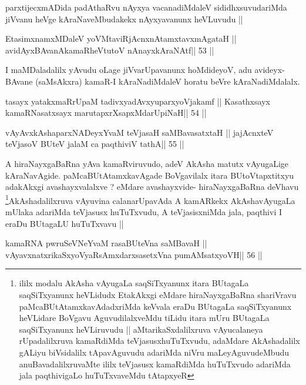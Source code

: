 \begin{artha}
parxtijecxmADida padAthaRvu nAyxya vacanadiMdaleV sididhxsuvudariMda
jiVvanu heVge kAraNaveMbudakekx nAyxyavanunx heVLuvudu ||
\end{artha}

\begin{shl}
EtasimxnamxMDaleV yoV\s MtaviRjAcnxnAtamxtavxmAgataH ||
avidAyxBAvanAkamaRheVtutoV nAnayxkAraNAtf\hfill || 53 ||
\end{shl}

\begin{artha}
I maMDaladalilx yAvudu oLage jiVvarUpavanunx hoMdideyoV, adu
avideyx-BAvane (saMsAkxra) kamaR-I kAraNadiMdaleV horatu beVre kAraNadiMdalalx.
\end{artha}

\begin{shl}
tasayx yatakxmaRrUpaM tadivxyadAvxyuparxyoVjakamf ||
Kasathxsayx kamaRNasatxsayx marutapxrXsapxMdarUpiNaH\hfill || 54 ||
\end{shl}

\begin{shl}
vAyAvxkAshaparxNADeyxYvaM teVjasaH saMBavasatxtaH ||
jajAcnxteV teVjasoV BUteV jalaM ca paqthiviV tathA\hfill || 55 ||
\end{shl}

\begin{artha}
A hiraNayxgaBaRna yAva kamaRviruvudo, adeV AkAsha matutx vAyugaLige
kAraNavAgide. paMcaBUtAtamxkavAgade BoVgavilalx itara BUtoVtapxtitxyu
adakAkxgi avashayxvalalxve ? eMdare avashayxvide- hiraNayxgaBaRna
deVhavu \footnote{ililx modalu AkAsha vAyugaLa saqSiTxyanunx itara
BUtagaLa saqSiTxyanunx heVLidudx EtakAkxgi eMdare hiraNayxgaBaRna
shariVravu paMcaBUtAtamxkavAdadxriMda keVvala eraDu BUtagaLa
saqSiTxyanunx heVLidare BoVgavu AguvudilalxveMdu tiLidu itara mUru
BUtagaLa saqSiTxyanunx heVLiruvudu || aMtarikaSxdalilxruva
vAyucalaneya rUpadalilxruva kamaRdiMda teVjasusxhuTuTxvudu, adaMdare
AkAshadalilx gALiyu biVsidalilx tApavAguvudu adariMda niVru
maLeyAguvudeMbudu anuBavadalilxruvaMte ililx teVjasusx kamaRdiMda
huTuTxvudo adariMda jala paqthivigaLo huTuTxvaveMdu tAtapxyeR}AkAshadalilxruva vAyuvina calanarUpavAda A
kamARkekx AkAshavAyugaLa mUlaka adariMda teVjasusx huTuTxvudu, A
teVjasisxniMda jala, paqthivi I eraDu BUtagaLU huTuTxvavu ||
\end{artha}

\begin{shl}
kamaRNA pwruSeVNeYvaM rasaBUteVna saMBavaH ||
vAyavxnatxrikaSxyoVyaRsAmxdarxsasetxVna pumAMsatxyoVH\hfill || 56 ||
\end{shl}

